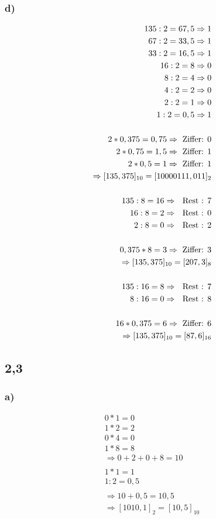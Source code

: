 \documentclass[12pt,a4paper]{article}
\begin{document}
\subsubsection*{d)}
\begin{align*}
135 : 2 = 67,5 \Rightarrow 1 \\
67 : 2 = 33,5 \Rightarrow 1 \\
33 : 2 = 16,5 \Rightarrow 1 \\
16 : 2 = 8 \Rightarrow 0 \\
8 : 2 = 4 \Rightarrow 0 \\
4 : 2 = 2 \Rightarrow 0 \\
2 : 2 = 1 \Rightarrow 0 \\
1 : 2 = 0,5 \Rightarrow 1 \\
\\
2 * 0,375 = 0,75 \Rightarrow \textrm{ Ziffer: } 0 \\
2 * 0,75 = 1,5 \Rightarrow \textrm{ Ziffer: } 1 \\
2 * 0,5 = 1 \Rightarrow \textrm{ Ziffer: } 1 \\
\Rightarrow [135,375]_{10} = [10000111,011]_{2} \\
\\
135 : 8 = 16 \Rightarrow \textrm{ \textrm{ Rest }: } 7 \\
16 : 8 = 2 \Rightarrow \textrm{ \textrm{ Rest }: } 0 \\
2 : 8 = 0 \Rightarrow \textrm{ \textrm{ Rest }: } 2 \\
\\
0,375 * 8 = 3 \Rightarrow \textrm{ Ziffer: } 3 \\
\Rightarrow [135,375]_{10} = [207,3]_{8} \\
\\
135 : 16 = 8 \Rightarrow \textrm{ \textrm{ Rest }: } 7 \\
8 : 16 = 0 \Rightarrow \textrm{ \textrm{ Rest }: } 8 \\
\\
16 * 0,375 = 6 \Rightarrow \textrm{ Ziffer: } 6 \\
\Rightarrow [135,375]_{10} = [87,6]_{16}
\end{align*}

\subsection*{2,3}
\subsubsection*{a)}
\begin{align*}
0 * 1 = 0 \\
1 * 2 = 2 \\
0 * 4 = 0 \\
1 * 8 = 8 \\
\Rightarrow 0 + 2 + 0 + 8 = 10 \\
\\
1 * 1 = 1 \\
1 : 2 = 0,5 \\
\\
\Rightarrow 10 + 0,5 = 10,5 \\
\Rightarrow [1010,1]_{2} = [10,5]_{10}
\end{align*}
\end{document}
